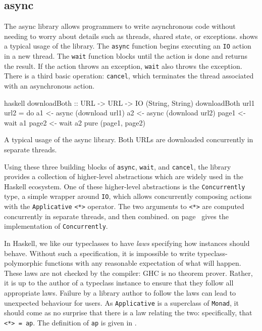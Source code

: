 \FloatBarrier

\subsection{async}
\label{sec:dejafu-casestudies-async}

The async library \parencite{async} allows programmers to write asynchronous
code without needing to worry about details such as threads, shared
state, or exceptions.   shows a typical usage
of the library.  The \verb|async| function begins executing an
\verb|IO| action in a new thread.  The \verb|wait| function blocks
until the action is done and returns the result.  If the action throws
an exception, \verb|wait| also throws the exception.  There is a third
basic operation: \verb|cancel|, which terminates the thread associated
with an asynchronous action.

\begin{listing}
\centering
\begin{cminted}{haskell}
downloadBoth :: URL -> URL -> IO (String, String)
downloadBoth url1 url2 = do
  a1 <- async (download url1)
  a2 <- async (download url2)
  page1 <- wait a1
  page2 <- wait a2
  pure (page1, page2)
\end{cminted}
\caption[A typical usage of the async library.]{A typical usage of the async library.  Both URLs are downloaded concurrently in separate threads.}\label{lst:async_example}
\end{listing}

Using these three building blocks of \verb|async|, \verb|wait|, and
\verb|cancel|, the library provides a collection of higher-level
abstractions which are widely used in the Haskell ecosystem.  One of
these higher-level abstractions is the \verb|Concurrently| type, a
simple wrapper around \verb|IO|, which allows concurrently composing
actions with the \verb|Applicative| \verb|<*>| operator.  The two
arguments to \verb|<*>| are computed concurrently in separate threads,
and then combined.   on
page~\pageref{lst:concurrently} gives the implementation of
\verb|Concurrently|.

In Haskell, we like our typeclasses to have \emph{laws} specifying how
instances should behave.  Without such a specification, it is
impossible to write typeclass-polymorphic functions with any
reasonable expectation of what will happen.  These laws are not
checked by the compiler: GHC is no theorem prover.  Rather, it is up
to the author of a typeclass instance to ensure that they follow all
appropriate laws.  Failure by a library author to follow the laws can
lead to unexpected behaviour for users.  As \verb|Applicative| is a
superclass of \verb|Monad|, it should come as no surprise that there
is a law relating the two: specifically, that \verb|<*> = ap|.  The
definition of \verb|ap| is given in .

